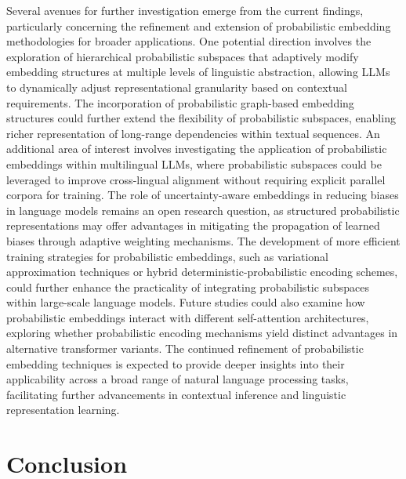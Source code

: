 \documentclass{article}
\begin{document}
Several avenues for further investigation emerge from the current findings, particularly concerning the refinement and extension of probabilistic embedding methodologies for broader applications. One potential direction involves the exploration of hierarchical probabilistic subspaces that adaptively modify embedding structures at multiple levels of linguistic abstraction, allowing LLMs to dynamically adjust representational granularity based on contextual requirements. The incorporation of probabilistic graph-based embedding structures could further extend the flexibility of probabilistic subspaces, enabling richer representation of long-range dependencies within textual sequences. An additional area of interest involves investigating the application of probabilistic embeddings within multilingual LLMs, where probabilistic subspaces could be leveraged to improve cross-lingual alignment without requiring explicit parallel corpora for training. The role of uncertainty-aware embeddings in reducing biases in language models remains an open research question, as structured probabilistic representations may offer advantages in mitigating the propagation of learned biases through adaptive weighting mechanisms. The development of more efficient training strategies for probabilistic embeddings, such as variational approximation techniques or hybrid deterministic-probabilistic encoding schemes, could further enhance the practicality of integrating probabilistic subspaces within large-scale language models. Future studies could also examine how probabilistic embeddings interact with different self-attention architectures, exploring whether probabilistic encoding mechanisms yield distinct advantages in alternative transformer variants. The continued refinement of probabilistic embedding techniques is expected to provide deeper insights into their applicability across a broad range of natural language processing tasks, facilitating further advancements in contextual inference and linguistic representation learning.


\section{Conclusion}
\end{document}
